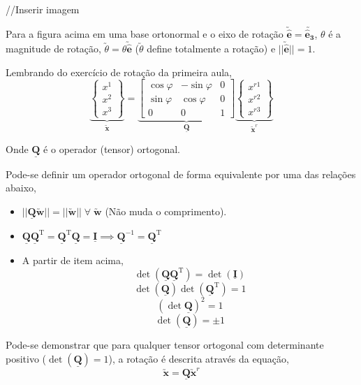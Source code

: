 //Inserir imagem

Para a figura acima em uma base ortonormal e o eixo de rotação $\utilde{\mathbf{\hat{e}}}=\utilde{\mathbf{\hat{e}_3}}$, $\theta$ é a magnitude de rotação, $\utilde{\theta}=\theta\utilde{\mathbf{\hat{e}}}$ ($\utilde{\theta}$ define totalmente a rotação) e $||\utilde{\mathbf{\hat{e}}}||=1$.

Lembrando do exercício de rotação da primeira aula,
\[
    \underbrace{\begin{Bmatrix}
        x^1 \\ x^2 \\ x^3
    \end{Bmatrix}}_{\displaystyle\utilde{\mathbf{x}}}
    =
    \underbrace{
    \begin{bmatrix}
        \cos\varphi & -\sin\varphi & 0 \\
        \sin\varphi & \cos\varphi & 0 \\
        0 & 0 & 1
    \end{bmatrix}}_{\displaystyle\underline{\mathbf{Q}}}
    \underbrace{
    \begin{Bmatrix}
        x^{r1} \\ x^{r2} \\ x^{r3}
    \end{Bmatrix}}_{\displaystyle\utilde{\mathbf{x}}^r}		
\]

Onde $\underline{\mathbf{Q}}$ é o operador (tensor) ortogonal.

Pode-se definir um operador ortogonal de forma equivalente por uma das relações abaixo,
\begin{itemize}
    \item $||\underline{\mathbf{Q}}\utilde{\mathbf{w}}||=||\utilde{\mathbf{w}}||\;\forall\;\utilde{\mathbf{w}}$ (Não muda o comprimento).
    \item $\underline{\mathbf{Q}}\underline{\mathbf{Q}}^{\text{T}}=\underline{\mathbf{Q}}^{\text{T}}\underline{\mathbf{Q}}=\underline{\mathbf{I}}\implies\underline{\mathbf{Q}}^{-1}=\underline{\mathbf{Q}}^{\text{T}}$
    \item A partir de item acima,
    	\[\det(\underline{\mathbf{Q}}\underline{\mathbf{Q}}^{\text{T}})=\det(\underline{\mathbf{I}})\]
    	\[\det(\underline{\mathbf{Q}})\det(\underline{\mathbf{Q}}^{\text{T}})=1\]
    	\[(\det\underline{\mathbf{Q}})^2=1\]
    	\[\det(\underline{\mathbf{Q}})=\pm1\]
\end{itemize}

Pode-se demonstrar que para qualquer tensor ortogonal com determinante positivo ($\det(\underline{\mathbf{Q}})=1$), a rotação é descrita através da equação,
\[\utilde{\mathbf{x}}=\underline{\mathbf{Q}}\utilde{\mathbf{x}}^r\]

